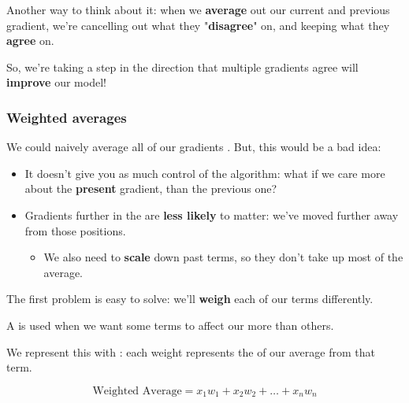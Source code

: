             Another way to think about it: when we \textbf{average} out our current and previous gradient, we're cancelling out what they "\textbf{disagree}" on, and keeping what they \textbf{agree} on.
            
            So, we're taking a step in the direction that multiple gradients agree will \textbf{improve} our model!
            
        
        \subsecdiv
            
        \subsubsection{Weighted averages}
        
            We could naively average all of our gradients . But, this would be a bad idea:
            
            \begin{itemize}
                \item It doesn't give you as much control of the algorithm: what if we care more about the \textbf{present} gradient, than the previous one?
                \item Gradients further in the  are \textbf{less likely} to matter: we've moved further away from those positions.
                    \begin{itemize}
                        \item We also need to \textbf{scale} down past terms, so they don't take up most of the average.
                    \end{itemize}
            \end{itemize}
            
            The first problem is easy to solve: we'll \textbf{weigh} each of our terms differently.\\
            
            \begin{concept}
                A  is used when we want some terms to affect our  more than others.
                
                We represent this with : each weight represents the  of our average from that term.
                
                \begin{equation*}
                    \text{Weighted Average} =
                    x_1w_1 + x_2w_2 + \dots + x_nw_n
                \end{equation*}
            \end{concept}

